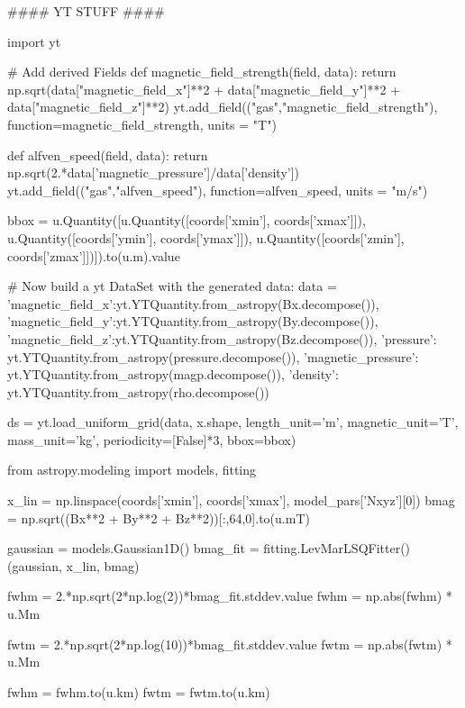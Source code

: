 \begin{pycode}[chapter3]
#### YT STUFF ####

import yt

# Add derived Fields
def magnetic_field_strength(field, data):
    return np.sqrt(data["magnetic_field_x"]**2 + data["magnetic_field_y"]**2 + data["magnetic_field_z"]**2)
yt.add_field(("gas","magnetic_field_strength"), function=magnetic_field_strength, units = "T")

def alfven_speed(field, data):
    return np.sqrt(2.*data['magnetic_pressure']/data['density'])
yt.add_field(("gas","alfven_speed"), function=alfven_speed, units = "m/s")

bbox = u.Quantity([u.Quantity([coords['xmin'], coords['xmax']]),
                   u.Quantity([coords['ymin'], coords['ymax']]),
                   u.Quantity([coords['zmin'], coords['zmax']])]).to(u.m).value

# Now build a yt DataSet with the generated data:
data = {'magnetic_field_x':yt.YTQuantity.from_astropy(Bx.decompose()),
        'magnetic_field_y':yt.YTQuantity.from_astropy(By.decompose()),
        'magnetic_field_z':yt.YTQuantity.from_astropy(Bz.decompose()),
        'pressure': yt.YTQuantity.from_astropy(pressure.decompose()),
        'magnetic_pressure': yt.YTQuantity.from_astropy(magp.decompose()),
        'density': yt.YTQuantity.from_astropy(rho.decompose())}

ds = yt.load_uniform_grid(data, x.shape, length_unit='m', magnetic_unit='T', mass_unit='kg', periodicity=[False]*3, bbox=bbox)
\end{pycode}


\begin{pycode}[chapter3]
from astropy.modeling import models, fitting

x_lin = np.linspace(coords['xmin'], coords['xmax'], model_pars['Nxyz'][0])
bmag = np.sqrt((Bx**2 + By**2 + Bz**2))[:,64,0].to(u.mT)

gaussian = models.Gaussian1D()
bmag_fit = fitting.LevMarLSQFitter()(gaussian, x_lin, bmag)

fwhm = 2.*np.sqrt(2*np.log(2))*bmag_fit.stddev.value
fwhm = np.abs(fwhm) * u.Mm

fwtm = 2.*np.sqrt(2*np.log(10))*bmag_fit.stddev.value
fwtm = np.abs(fwtm) * u.Mm

fwhm = fwhm.to(u.km)
fwtm = fwtm.to(u.km)
\end{pycode}

\newcommand{\BO}{{B_{0z}}}
\newcommand{\GO}{{G}}
\newcommand{\bc}{{b_{00}}}
\newcommand{\bF}{{b_{01}}}
\newcommand{\za}{{z_{1}}}
\newcommand{\bb}{{b_{02}}}
\newcommand{\zb}{{z_{2}}}

